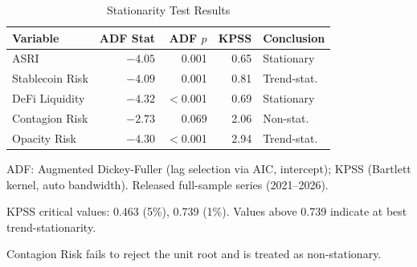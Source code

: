 \begin{table}[H]
\begin{threeparttable}
\centering
\caption{Stationarity Test Results}
\label{tab:stationarity}
\small
\begin{tabular}{@{}l*{3}{r}l@{}}
\toprule
Variable & ADF Stat & ADF $p$ & KPSS & Conclusion \\
\midrule
ASRI            & $-4.05$ & 0.001 & 0.65 & Stationary \\
Stablecoin Risk & $-4.09$ & 0.001 & 0.81 & Trend-stat. \\
DeFi Liquidity  & $-4.32$ & $<$0.001 & 0.69 & Stationary \\
Contagion Risk  & $-2.73$ & 0.069 & 2.06 & Non-stat. \\
Opacity Risk    & $-4.30$ & $<$0.001 & 2.94 & Trend-stat. \\
\bottomrule
\end{tabular}
\begin{tablenotes}
\small
\item ADF: Augmented Dickey-Fuller (lag selection via AIC, intercept); KPSS (Bartlett kernel, auto bandwidth). Released full-sample series (2021--2026).
\item KPSS critical values: 0.463 (5\%), 0.739 (1\%). Values above 0.739 indicate at best trend-stationarity.
\item Contagion Risk fails to reject the unit root and is treated as non-stationary.
\end{tablenotes}
\end{threeparttable}
\end{table}
